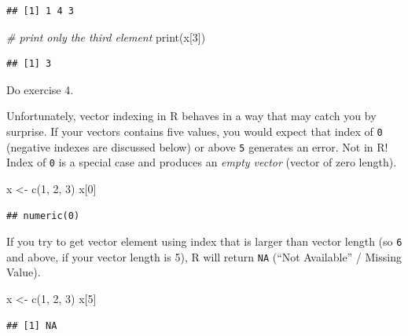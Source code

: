 \documentclass[
]{book}
\newenvironment{Shaded}{\begin{snugshade}}{\end{snugshade}}
\newcommand{\CommentTok}[1]{\textcolor[rgb]{0.56,0.35,0.01}{\textit{#1}}}
\newcommand{\DecValTok}[1]{\textcolor[rgb]{0.00,0.00,0.81}{#1}}
\newcommand{\FunctionTok}[1]{\textcolor[rgb]{0.00,0.00,0.00}{#1}}
\newcommand{\NormalTok}[1]{#1}
\newcommand{\OtherTok}[1]{\textcolor[rgb]{0.56,0.35,0.01}{#1}}
\begin{document}
\begin{verbatim}
## [1] 1 4 3
\end{verbatim}

\begin{Shaded}
\begin{Highlighting}[]
\CommentTok{\# print only the third element}
\FunctionTok{print}\NormalTok{(x[}\DecValTok{3}\NormalTok{])}
\end{Highlighting}
\end{Shaded}

\begin{verbatim}
## [1] 3
\end{verbatim}

Do exercise 4.

Unfortunately, vector indexing in R behaves in a way that may catch you by surprise. If your vectors contains five values, you would expect that index of \texttt{0} (negative indexes are discussed below) or above \texttt{5} generates an error. Not in R! Index of \texttt{0} is a special case and produces an \emph{empty vector} (vector of zero length).

\begin{Shaded}
\begin{Highlighting}[]
\NormalTok{x }\OtherTok{\textless{}{-}} \FunctionTok{c}\NormalTok{(}\DecValTok{1}\NormalTok{, }\DecValTok{2}\NormalTok{, }\DecValTok{3}\NormalTok{)}
\NormalTok{x[}\DecValTok{0}\NormalTok{]}
\end{Highlighting}
\end{Shaded}

\begin{verbatim}
## numeric(0)
\end{verbatim}

If you try to get vector element using index that is larger than vector length (so \texttt{6} and above, if your vector length is 5), R will return \texttt{NA} (``Not Available'' / Missing Value).

\begin{Shaded}
\begin{Highlighting}[]
\NormalTok{x }\OtherTok{\textless{}{-}} \FunctionTok{c}\NormalTok{(}\DecValTok{1}\NormalTok{, }\DecValTok{2}\NormalTok{, }\DecValTok{3}\NormalTok{)}
\NormalTok{x[}\DecValTok{5}\NormalTok{]}
\end{Highlighting}
\end{Shaded}

\begin{verbatim}
## [1] NA
\end{verbatim}
\end{document}
